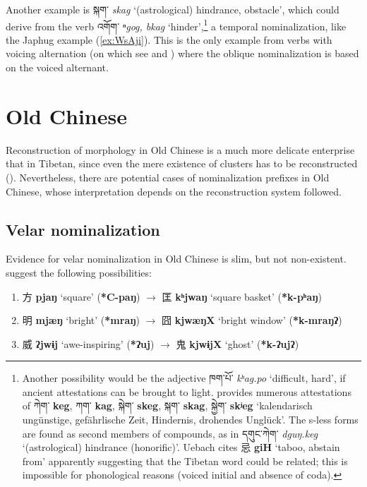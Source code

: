 \documentclass[oneside,a4paper,11pt]{article}
\newcommand{\ipa}[1]{\textbf{{\phon\mbox{#1}}}} %
\newcommand{\zh}[1]{{\cn #1}}
\newcommand{\tibet}[3]{{\tibetain#1} \textit{\phon#2} `#3'}
\newcommand{\tibetan}[1]{{\tibetain#1}}
\newcommand{\zhc}[2]{\zh{#1} \ipa{#2}}
\begin{document}
Another example is \tibet{སྐག་}{skag}{(astrological) hindrance, obstacle}, which could derive from the verb \tibet{འགོག་}{ⁿgog, bkag}{hinder},\footnote{Another possibility would be the adjective \tibet{ཁག་པོ་}{kʰag.po}{difficult, hard}, if ancient attestations can be brought to light. \citet[109]{uebach06woerterbuch02} provides numerous attestations of  \tibetan{ཀེག་} \ipa{keg}, \tibetan{ཀག་} \ipa{kag}, \tibetan{སྐེག་} \ipa{skeg}, \tibetan{སྐག་} \ipa{skag}, \tibetan{སྐྱེག་} \ipa{skʲeg} `kalendarisch ungünstige, gefährlische Zeit, Hindernis, drohendes Unglück'. The s-less forms are found as second members of compounds, as in \tibet{དགུང་ཀེག་}{dguŋ.keg}{(astrological) hindrance (honorific)}. Uebach cites \zhc{忌}{giH} `taboo, abstain from' apparently suggesting that the Tibetan word could be related; this is impossible for phonological reasons (voiced initial and absence of coda). } a temporal nominalization, like the Japhug example (\ref{ex:WsAji}). This is the only example from verbs with voicing alternation (on which see \citealt{jacques12internal} and \citealt{hill14voicing}) where the oblique nominalization is based on the voiced alternant.

 

\section{Old Chinese}
Reconstruction of morphology in Old Chinese is a much more delicate enterprise that in Tibetan, since even the mere existence of clusters has to be reconstructed (\citealt{gong17clusters}). Nevertheless, there are potential cases of nominalization prefixes in Old Chinese, whose interpretation depends on the reconstruction system followed.

\subsection{Velar nominalization}
Evidence for velar nominalization in Old Chinese is slim, but not non-existent. \citet[57]{bs14oc} suggest the following possibilities:

\begin{enumerate}
\item \zhc{方}{pjaŋ} ‘square’ (\ipa{*C-paŋ})  $\rightarrow$ \zhc{匡}{kʰjwaŋ} ‘square basket’   (\ipa{*k-pʰaŋ})
\item \zhc{明}{mjæŋ} ‘bright’ (\ipa{*mraŋ})  $\rightarrow$ \zhc{囧}{kjwæŋX} ‘bright window’   (\ipa{*k-mraŋʔ})
\item \zhc{威}{ʔjwɨj} ‘awe-inspiring’ (\ipa{*ʔuj})  $\rightarrow$ \zhc{鬼}{kjwɨjX} ‘ghost’   (\ipa{*k-ʔujʔ})
\end{enumerate}
\end{document}
